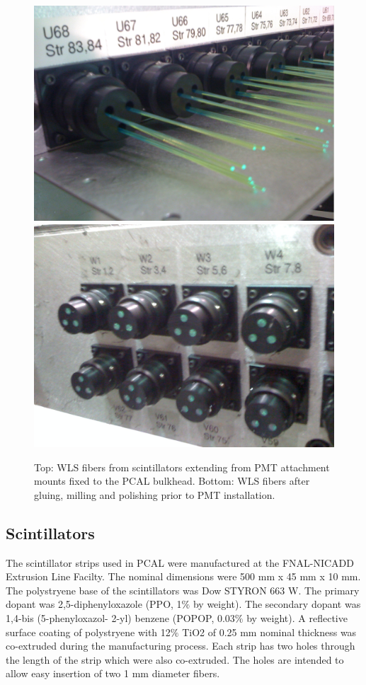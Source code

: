 \begin{figure}[hbt]
\centering
\includegraphics[width=0.9\columnwidth,keepaspectratio]{img/S3_5a.png}
\includegraphics[width=0.9\columnwidth,keepaspectratio]{img/S3_5b.png}
\caption[PCAL UVW Layers]{Top: WLS fibers from scintillators extending from PMT attachment mounts fixed to the PCAL bulkhead. Bottom: WLS fibers after gluing, milling and polishing prior to PMT installation.}
\label{fig:S3_5}
\end{figure}

\subsection{Scintillators}

The scintillator strips used in PCAL were manufactured at the FNAL-NICADD Extrusion Line Facilty.  The nominal dimensions were 500 mm x 45 mm x 10 mm. The polystryene base of the scintillators was Dow STYRON 663 W. The primary dopant was 2,5-diphenyloxazole (PPO, 1$\%$ by weight). The secondary dopant was 1,4-bis (5-phenyloxazol- 2-yl) benzene (POPOP, 0.03$\%$ by weight).  A reflective surface coating of polystryene with 12$\%$ TiO2 of 0.25 mm nominal thickness was co-extruded during the manufacturing process.  Each strip has two holes through the length of the strip which were also co-extruded. The holes are intended to allow easy insertion of two 1 mm diameter fibers.

